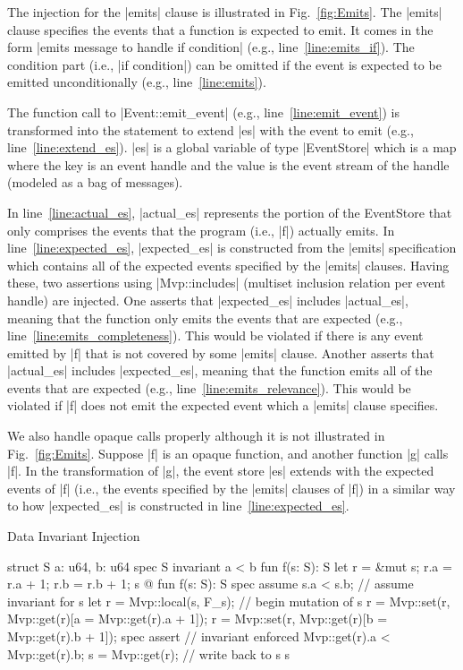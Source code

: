 The injection for the |emits| clause is illustrated in Fig.~\ref{fig:Emits}. The |emits| clause specifies the events that a function is expected to emit. It comes in the form |emits message to handle if condition| (e.g., line~\ref{line:emits_if}). The condition part (i.e., |if condition|) can be omitted if the event is expected to be emitted unconditionally (e.g., line~\ref{line:emits}).

The function call to |Event::emit_event| (e.g., line~\ref{line:emit_event}) is transformed into the statement to extend |es| with the event to emit (e.g., line~\ref{line:extend_es}). |es| is a global variable of type |EventStore| which is a map where the key is an event handle and the value is the event stream of the handle (modeled as a bag of messages).

In line~\ref{line:actual_es}, |actual_es| represents the portion of the EventStore that only comprises the events that the program (i.e., |f|) actually emits. In line~\ref{line:expected_es}, |expected_es| is constructed from the |emits| specification which contains all of the expected events specified by the |emits| clauses. Having these, two assertions using |Mvp::includes| (multiset inclusion relation per event handle) are injected. One asserts that |expected_es| includes |actual_es|, meaning that the function only emits the events that are expected (e.g., line~\ref{line:emits_completeness}). This would be violated if there is any event emitted by |f| that is not covered by some |emits| clause. Another asserts that |actual_es| includes |expected_es|, meaning that the function emits all of the events that are expected (e.g., line~\ref{line:emits_relevance}). This would be violated if |f| does not emit the expected event which a |emits| clause specifies.

We also handle opaque calls properly although it is not illustrated in Fig.~\ref{fig:Emits}. Suppose |f| is an opaque function, and another function |g| calls |f|. In the transformation of |g|, the event store |es| extends with the expected events of |f| (i.e., the events specified by the |emits| clauses of |f|) in a similar way to how |expected_es| is constructed in line~\ref{line:expected_es}.

\vspace{-2ex}

\begin{Figure}
  \caption{Data Invariant Injection}
  \label{fig:DataInvariants}
  \centering
\begin{MoveBoxNumbered}
  struct S { a: u64, b: u64 }
  spec S { invariant a < b }
  fun f(s: S): S {
    let r = &mut s;
    r.a = r.a + 1;
    r.b = r.b + 1;
    s
  }
  @\transform@
  fun f(s: S): S {
    spec assume s.a < s.b;      // assume invariant for s
    let r = Mvp::local(s, F_s); // begin mutation of s
    r = Mvp::set(r, Mvp::get(r)[a = Mvp::get(r).a + 1]);
    r = Mvp::set(r, Mvp::get(r)[b = Mvp::get(r).b + 1]);
    spec assert                 // invariant enforced
      Mvp::get(r).a < Mvp::get(r).b;
    s = Mvp::get(r);            // write back to s
    s
  }
\end{MoveBoxNumbered}
\end{Figure}

